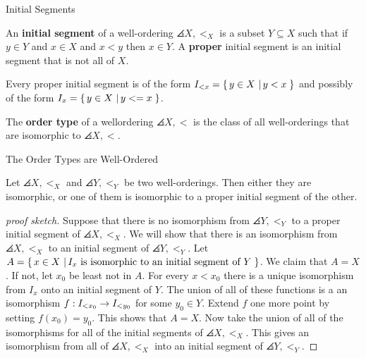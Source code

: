 \documentclass[pdf,final]{prosper}
\newcommand{\skipsmall}{\vspace{1em}}
\begin{document}
\begin{slide}{Initial Segments}
\begin{definition}
An \textbf{initial segment} of a well-ordering $\angles{X,<_X}$ is a subset
$Y\subseteq X$ such that if $y\in Y$ and $x\in X$ and $x<y$ then $x\in Y$.
A \textbf{proper} initial segment is an initial segment that is not all of $X$.
\end{definition}

\skipsmall

\begin{remark}
Every proper initial segment is of the form 
$I_{<x}=\left\{ \, y\in X \, \left| \, y<x \, \right.\right\}$ and possibly of the form $I_x=\left\{ \, y\in X \, \left| \, y<=x \, \right.\right\}$.
\end{remark}

\skipsmall

\begin{definition}
The \textbf{order type} of a wellordering $\angles{X,<}$ is the class of all
well-orderings that are isomorphic to $\angles{X,<}$.
\end{definition}
\end{slide}

\begin{slide}{The Order Types are Well-Ordered}
\begin{theorem}
Let $\angles{X,<_X}$ and $\angles{Y,<_Y}$ be two well-orderings. Then either they
are isomorphic, or one of them is isomorphic to a proper initial segment of the other.
\end{theorem}
\begin{proof}[proof sketch]
Suppose that there is no isomorphism from $\angles{Y,<_Y}$ to a proper initial
segment of $\angles{X,<_X}$. We will show that there is an isomorphism from 
$\angles{X,<_X}$ to an initial segment of $\angles{Y,<_Y}$. Let
$A=\left\{ \, x\in X \, \left| \, I_x \text{ is isomorphic to an initial segment of } Y \, \right.\right\}$. We
claim that $A=X$.
If not, let $x_0$ be least not in $A$. For every $x<x_0$ there is a unique
isomorphism from $I_x$ onto an initial segment of $Y$. The union of all of these
functions is a an isomorphism $f:I_{<x_0}\rightarrow {I_{<y_0}}$ for some $y_0\in Y$.
Extend $f$ one more point by setting $f(x_0)=y_0$. This shows that $A=X$.
Now take the union of all of the isomorphisms for all of the initial segments of
$\angles{X,<_X}$. This gives an isomorphism from all of $\angles{X,<_X}$ into an
initial segment of $\angles{Y,<_Y}$.
\end{proof}
\end{slide}
\end{document}

